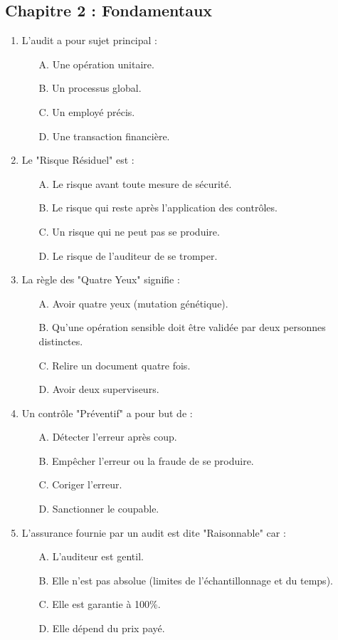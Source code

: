 \subsection*{Chapitre 2 : Fondamentaux}
\begin{enumerate}
    \item L'audit a pour sujet principal :
    \begin{itemize} \item[A.] Une opération unitaire. \item[B.] Un processus global. \item[C.] Un employé précis. \item[D.] Une transaction financière. \end{itemize}
    \item Le "Risque Résiduel" est :
    \begin{itemize} \item[A.] Le risque avant toute mesure de sécurité. \item[B.] Le risque qui reste après l'application des contrôles. \item[C.] Un risque qui ne peut pas se produire. \item[D.] Le risque de l'auditeur de se tromper. \end{itemize}
    \item La règle des "Quatre Yeux" signifie :
    \begin{itemize} \item[A.] Avoir quatre yeux (mutation génétique). \item[B.] Qu'une opération sensible doit être validée par deux personnes distinctes. \item[C.] Relire un document quatre fois. \item[D.] Avoir deux superviseurs. \end{itemize}
    \item Un contrôle "Préventif" a pour but de :
    \begin{itemize} \item[A.] Détecter l'erreur après coup. \item[B.] Empêcher l'erreur ou la fraude de se produire. \item[C.] Coriger l'erreur. \item[D.] Sanctionner le coupable. \end{itemize}
    \item L'assurance fournie par un audit est dite "Raisonnable" car :
    \begin{itemize} \item[A.] L'auditeur est gentil. \item[B.] Elle n'est pas absolue (limites de l'échantillonnage et du temps). \item[C.] Elle est garantie à 100\%. \item[D.] Elle dépend du prix payé. \end{itemize}
\end{enumerate}

